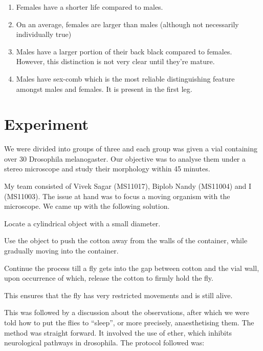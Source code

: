 		\begin{enumerate}
			\item Females have a shorter life compared to males.
			\item On an average, females are larger than males (although not necessarily individually true)
			\item Males have a larger portion of their back black compared to females. However, this distinction is not very clear until they're mature.
			\item Males have sex-comb which is the most reliable distinguishing feature amongst males and females. It is present in the first leg.
		\end{enumerate}

\section{Experiment}
	We were divided into groups of three and each group was given a vial containing over 30 Drosophila melanogaster. Our objective was to analyse them under a stereo microscope and study their morphology within 45 minutes.
	\par
	My team consisted of Vivek Sagar (MS11017), Biplob Nandy (MS11004) and I (MS11003). The issue at hand was to focus a moving organism with the microscope. We came up with the following solution.
	\begin{aenumerate}
		\item Locate a cylindrical object with a small diameter.
		\item Use the object to push the cotton away from the walls of the container, while gradually moving into the container.
		\item Continue the process till a fly gets into the gap between cotton and the vial wall, upon occurrence of which, release the cotton to firmly hold the fly.
		\item This ensures that the fly has very restricted movements and is still alive.
	\end{aenumerate}
	\par
	This was followed by a discussion about the observations, after which we were told how to put the flies to ``sleep'', or more precisely, anaesthetising them.  The method was straight forward. It involved the use of ether, which inhibits neurological pathways in drosophila. The protocol followed was:
